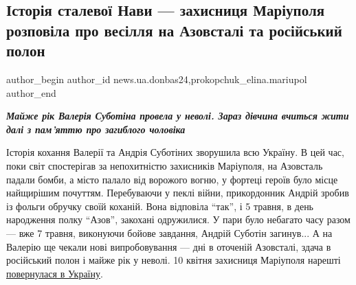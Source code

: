  
 
 
 
 
 
\subsection{Історія сталевої Нави — захисниця Маріуполя розповіла про весілля на Азовсталі та російський полон}
\label{sec:05_05_2023.stz.news.ua.donbas24.1.istoria_stalevoj_navy}
 
\ifcmt
 author_begin
   author_id news.ua.donbas24,prokopchuk_elina.mariupol
 author_end
\fi


\begin{center}
\em\color{blue}\Large\bfseries
Майже рік Валерія Суботіна провела у неволі. Зараз дівчина вчиться жити далі з
пам'яттю про загиблого чоловіка
\end{center}


Історія кохання Валерії та Андрія Суботіних зворушила всю Україну. В цей час,
поки світ спостерігав за непохитністю захисників Маріуполя, на Азовсталь падали
бомби, а місто палало від ворожого вогню, у фортеці героїв було місце
найщирішим почуттям. Перебуваючи у пеклі війни, прикордонник Андрій зробив із
фольги обручку своїй коханій. Вона відповіла \enquote{так}, і 5 травня, в день
народження полку \enquote{Азов}, закохані одружилися. У пари було небагато часу разом —
вже 7 травня, виконуючи бойове завдання, Андрій Суботін загинув... А на Валерію
ще чекали нові випробовування — дні в оточеній Азовсталі, здача в російський
полон і майже рік у неволі. 10 квітня захисниця Маріуполя нарешті \href{https://donbas24.news/news/nava-povernulasya-z-polonu-zvilnili-zaxisnicyu-mariupolya-valeriyu-subotinu}{повернулася в Україну}.

